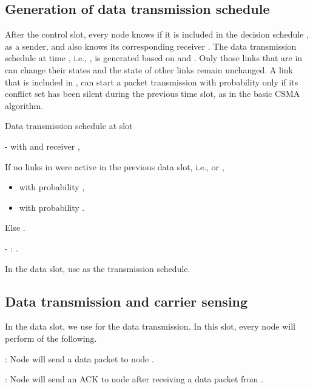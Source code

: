 \documentclass[10pt,onecolumn,draftclsnofoot,journal]{IEEEtran}
\begin{document}
\subsection*{Generation of data transmission schedule}
After the control slot, every node  knows if it is included in the decision schedule , as a sender, and also knows its corresponding receiver . The data transmission schedule at time , i.e., , is generated based on  and . Only those links that are in  can change their states and the state of other links remain unchanged. A link  that is included in , can start a packet transmission with probability  only if its conflict set has been silent during the previous time slot, as in the basic CSMA algorithm.
\begin{algorithm}\label{alg}
\caption{Data transmission schedule at slot }
\begin{algorithmic}[1]
\STATE
-   with  and receiver ,

If no links in  were active in the previous data slot, i.e.,  or ,
\begin{itemize}
\item  with probability ,
\item   with probability .
\end{itemize}
Else
 .


- : .

\STATE In the data slot, use  as the transmission schedule.
\end{algorithmic}
\end{algorithm}
\subsection*{Data transmission and carrier sensing}
In the data slot, we use  for the data transmission. In this slot, every node  will perform of the following.

: Node  will send a data packet to node .

: Node  will send an ACK to node  after receiving a data packet from .
\end{document}
